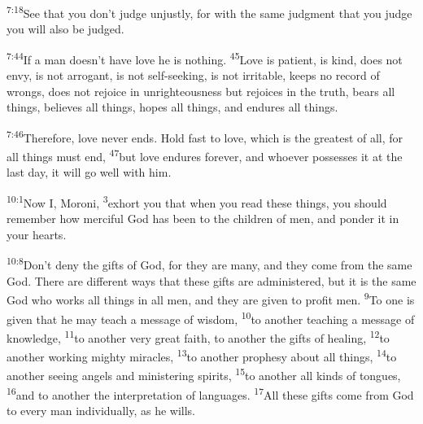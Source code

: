\documentclass[openany,12pt,english]{book}
\newenvironment{para}{\par\pretolerance=100\tolerance=200\setlength{\emergencystretch}{0.6em}\relax}{\par}
\begin{document}
\begin{para}
    \textsuperscript{7:18}\thinspace{}See that you don't judge un\-just\-ly, for with the same judg\-ment that you judge you will al\-so be judged.
\end{para}

\bigskip{}

\begin{para}
    \textsuperscript{7:44}\thinspace{}If a man does\-n't have love he is noth\-ing.
    \textsuperscript{45}\thinspace{}Love is pa\-tient, is kind, does not en\-vy, is not ar\-ro\-gant, is not self-seeking, is not ir\-ri\-ta\-ble, keeps no rec\-ord of wrongs, does not re\-joice in unrighteousness but rejoices in the truth, bears all things, believes all things, hopes all things, and endures all things.
\end{para}

\begin{para}
    \textsuperscript{7:46}\thinspace{}There\-fore, love nev\-er ends. Hold fast to love, which is the great\-est of all, for all things must end,
    \textsuperscript{47}\thinspace{}but love endures for\-ev\-er, and who\-ev\-er possesses it at the last day, it will go well with him.
\end{para}

\bigskip{}

\begin{para}
    \textsuperscript{10:1}\thinspace{}Now I, Moroni,
    \textsuperscript{3}\thinspace{}ex\-hort you that when you read these things, you should re\-mem\-ber how mer\-ci\-ful God has been to the chil\-dren of men, and pon\-der it in your hearts.
\end{para}

\begin{para}
    \textsuperscript{10:8}\thinspace{}Don't de\-ny the gifts of God, for they are man\-y, and they come from the same God. There are dif\-fer\-ent ways that these gifts are administered, but it is the same God who works all things in all men, and they are giv\-en to prof\-it men.
    \textsuperscript{9}\thinspace{}To one is giv\-en that he may teach a mes\-sage of wis\-dom,
    \textsuperscript{10}\thinspace{}to an\-oth\-er teach\-ing a mes\-sage of knowl\-edge,
    \textsuperscript{11}\thinspace{}to an\-oth\-er ver\-y great faith, to an\-oth\-er the gifts of heal\-ing,
    \textsuperscript{12}\thinspace{}to an\-oth\-er work\-ing might\-y miracles,
    \textsuperscript{13}\thinspace{}to an\-oth\-er proph\-e\-sy a\-bout all things,
    \textsuperscript{14}\thinspace{}to an\-oth\-er see\-ing angels and ministering spirits,
    \textsuperscript{15}\thinspace{}to an\-oth\-er all kinds of tongues,
    \textsuperscript{16}\thinspace{}and to an\-oth\-er the in\-ter\-pre\-ta\-tion of languages.
    \textsuperscript{17}\thinspace{}All these gifts come from God to eve\-ry man in\-di\-vid\-u\-al\-ly, as he wills.
\end{para}
\end{document}
